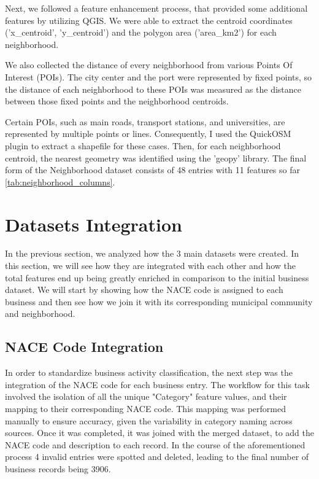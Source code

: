 Next, we followed a feature enhancement process, that provided some additional features by utilizing QGIS. We were able to extract the centroid coordinates ('x\_centroid', 'y\_centroid') and the polygon area ('area\_km2') for each neighborhood.

We also collected the distance of every neighborhood from various Points Of Interest (POIs). The city center and the port were represented by fixed points, so the distance of each neighborhood to these POIs was measured as the distance between those fixed points and the neighborhood centroids.

Certain POIs, such as main roads, transport stations, and universities, are represented by multiple points or lines. Consequently, I used the QuickOSM plugin to extract a shapefile for these cases. Then, for each neighborhood centroid, the nearest geometry was identified using the 'geopy' library. The final form of the Neighborhood dataset consists of 48 entries with 11 features so far \ref{tab:neighborhood_columns}.


\section{Datasets Integration}


In the previous section, we analyzed how the 3 main datasets were created. In this section, we will see how they are integrated with each other and how the total features end up being greatly enriched in comparison to the initial business dataset. We will start by showing how the NACE code is assigned to each business and then see how we join it with its corresponding municipal community and neighborhood.


\subsection{NACE Code Integration}

In order to standardize business activity classification, the next step was the integration of the NACE code for each business entry. The workflow for this task involved the isolation of all the unique "Category" feature values, and their mapping to their corresponding NACE code. This mapping was performed manually to ensure accuracy, given the variability in category naming across sources. Once it was completed, it was joined with the merged dataset, to add the NACE code and description to each record. In the course of the aforementioned process 4 invalid entries were spotted and deleted, leading to the final number of business records being 3906. 


